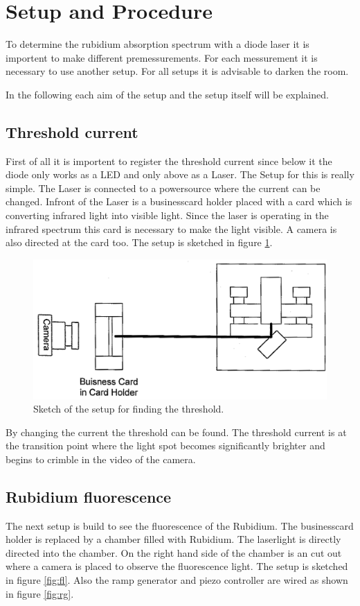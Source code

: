 \section{Setup and Procedure}
To determine the rubidium absorption spectrum with a diode laser it is importent to make different premessurements.
For each messurement it is necessary to use another setup. For all setups it is advisable to darken the room.

\noindent
In the following each aim of the setup and the setup itself will be explained.

\subsection{Threshold current}
First of all it is importent to register the threshold current since below it the diode only works as a LED and 
only above as a Laser.
The Setup for this is really simple. The Laser is connected to a powersource where the current can be changed. 
Infront of the Laser is a businesscard holder placed with a card which is converting infrared light into 
visible light. 
Since the laser is operating in the infrared spectrum this card is necessary to make the light visible.
A camera is also directed at the card too. The setup is sketched in figure \ref{fig:th}.

\begin{figure}[H]
	\centering
	\includegraphics[width=\textwidth]{setup_threshold.png}
	\caption{Sketch of the setup for finding the threshold. \cite{V60}}
	\label{fig:th}
\end{figure}

\noindent
By changing the current the threshold can be found. The threshold current is at the transition point where the light spot
becomes significantly brighter and begins to crimble in the video of the camera.

\subsection{Rubidium fluorescence}
The next setup is build to see the fluorescence of the Rubidium. The businesscard holder is replaced by a chamber
filled with Rubidium. 
The laserlight is directly directed into the chamber. On the right hand side of the chamber is an cut out where
a camera is placed to observe the fluorescence light. The setup is sketched in figure \ref{fig:fl}. Also
 the ramp generator and piezo controller are wired as shown in figure \ref{fig:rg}.

